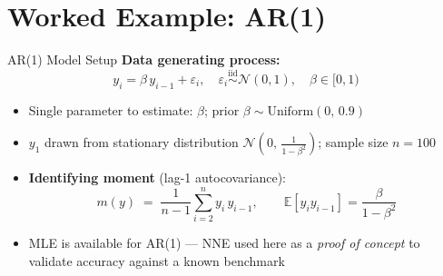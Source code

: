 \documentclass[aspectratio=169,professionalfonts]{beamer}
\newcommand{\hl}[1]{\textbf{\textcolor{UGARed}{#1}}}
\begin{document}
\section{Worked Example: AR(1)}

\begin{frame}{AR(1) Model Setup}
  \hl{Data generating process:}
  \[
    y_i = \beta\, y_{i-1} + \varepsilon_i,
    \quad \varepsilon_i \overset{\text{iid}}{\sim} \mathcal{N}(0, 1),
    \quad \beta \in [0,1)
  \]
  \begin{itemize}
    \item Single parameter to estimate: $\beta$; prior $\beta \sim \mathrm{Uniform}(0,\, 0.9)$
    \item $y_1$ drawn from stationary distribution $\mathcal{N}\!\left(0,\, \tfrac{1}{1-\beta^2}\right)$;
          sample size $n = 100$
    \item \hl{Identifying moment} (lag-1 autocovariance):
          \[
            m(y) \;=\; \frac{1}{n-1}\sum_{i=2}^{n} y_i\, y_{i-1},
            \qquad \mathbb{E}[y_i y_{i-1}] = \frac{\beta}{1-\beta^2}
          \]
    \item MLE is available for AR(1) --- NNE used here as a \textit{proof of concept}
          to validate accuracy against a known benchmark
  \end{itemize}
\end{frame}
\end{document}
